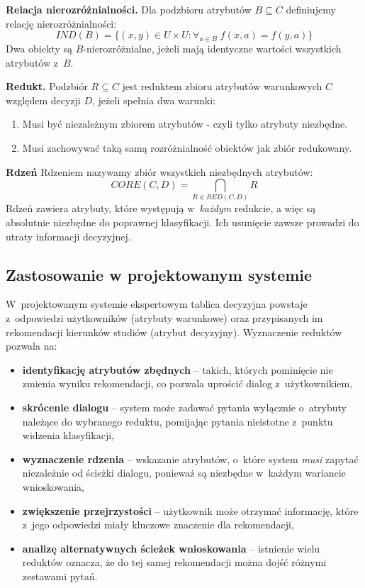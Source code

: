 \documentclass[12pt,a4paper,oneside]{article}
\begin{document}
\textbf{Relacja nierozróżnialności.} Dla podzbioru atrybutów $B \subseteq C$ definiujemy relację nierozróżnialności:
\[
    IND(B) = \{(x, y) \in U \times U : \forall_{a \in B}\; f(x,a) = f(y,a)\}
\]
Dwa obiekty są $B$-nierozróżnialne, jeżeli mają identyczne wartości wszystkich atrybutów z~$B$.

\textbf{Redukt.} Podzbiór $R \subseteq C$ jest reduktem zbioru atrybutów warunkowych $C$ względem decyzji $D$, jeżeli spełnia dwa warunki:
\begin{enumerate}
    \item Musi być niezależnym zbiorem atrybutów - czyli tylko atrybuty niezbędne.
    \item Musi zachowywać taką samą rozróżnialność obiektów jak zbiór redukowany.
\end{enumerate}

\textbf{Rdzeń} Rdzeniem nazywamy zbiór wszystkich niezbędnych atrybutów:
\[
    CORE(C, D) = \bigcap_{R \in RED(C,D)} R
\]
Rdzeń zawiera atrybuty, które występują w~\emph{każdym} redukcie, a więc są absolutnie niezbędne do poprawnej klasyfikacji. Ich usunięcie zawsze prowadzi do utraty informacji decyzyjnej.

\subsection{Zastosowanie w projektowanym systemie}

W~projektowanym systemie ekspertowym tablica decyzyjna powstaje z~odpowiedzi użytkowników (atrybuty warunkowe) oraz przypisanych im rekomendacji kierunków studiów (atrybut decyzyjny). Wyznaczenie reduktów pozwala na:

\begin{itemize}
    \item \textbf{identyfikację atrybutów zbędnych} -- takich, których pominięcie nie zmienia wyniku rekomendacji, co pozwala uprościć dialog z~użytkownikiem,
    \item \textbf{skrócenie dialogu} -- system może zadawać pytania wyłącznie o~atrybuty należące do wybranego reduktu, pomijając pytania nieistotne z~punktu widzenia klasyfikacji,
    \item \textbf{wyznaczenie rdzenia} -- wskazanie atrybutów, o~które system \emph{musi} zapytać niezależnie od ścieżki dialogu, ponieważ są niezbędne w~każdym wariancie wnioskowania,
    \item \textbf{zwiększenie przejrzystości} -- użytkownik może otrzymać informację, które z~jego odpowiedzi miały kluczowe znaczenie dla rekomendacji,
    \item \textbf{analizę alternatywnych ścieżek wnioskowania} -- istnienie wielu reduktów oznacza, że do tej samej rekomendacji można dojść różnymi zestawami pytań.
\end{itemize}
\end{document}
